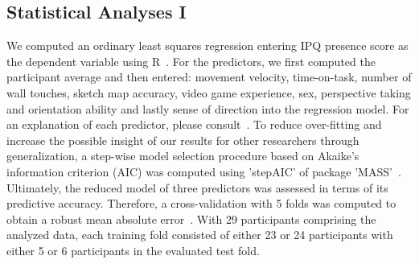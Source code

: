 \subsection{Statistical Analyses I} We computed an ordinary least squares regression entering IPQ presence score as the dependent variable using R~\cite{rver}. For the predictors, we first computed the participant average and then entered: movement velocity, time-on-task, number of wall touches, sketch map accuracy, video game experience, sex, perspective taking and orientation ability and lastly sense of direction into the regression model. For an explanation of each predictor, please consult~\cite{gehrke2018}. To reduce over-fitting and increase the possible insight of our results for other researchers through generalization, a step-wise model selection procedure based on Akaike's information criterion (AIC) was computed using 'stepAIC' of package 'MASS'~\cite{aic, mass}.
Ultimately, the reduced model of three predictors was assessed in terms of its predictive accuracy. Therefore, a cross-validation with 5 folds was computed to obtain a robust mean absolute error~\cite{cv, mae}. With 29 participants comprising the analyzed data, each training fold consisted of either 23 or 24 participants with either 5 or 6 participants in the evaluated test fold.
